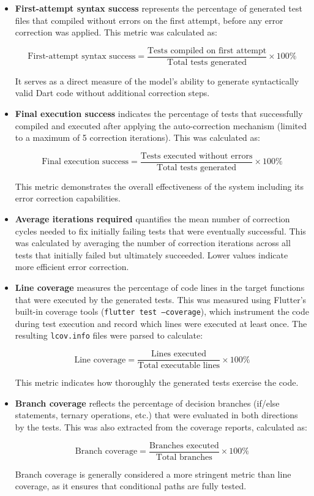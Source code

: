 \begin{itemize}
    \item \textbf{First-attempt syntax success} represents the percentage of generated test files that compiled without errors on the first attempt, before any error correction was applied. This metric was calculated as:
     
     \[
     \text{First-attempt syntax success} = \frac{\text{Tests compiled on first attempt}}{\text{Total tests generated}} \times 100\%
     \]
     
     It serves as a direct measure of the model's ability to generate syntactically valid Dart code without additional correction steps.
    
    \item \textbf{Final execution success} indicates the percentage of tests that successfully compiled and executed after applying the auto-correction mechanism (limited to a maximum of 5 correction iterations). This was calculated as:
    
    \[
    \text{Final execution success} = \frac{\text{Tests executed without errors}}{\text{Total tests generated}} \times 100\%
    \]
    
    This metric demonstrates the overall effectiveness of the system including its error correction capabilities.
    
    \item \textbf{Average iterations required} quantifies the mean number of correction cycles needed to fix initially failing tests that were eventually successful. This was calculated by averaging the number of correction iterations across all tests that initially failed but ultimately succeeded. Lower values indicate more efficient error correction.
    
    \item \textbf{Line coverage} measures the percentage of code lines in the target functions that were executed by the generated tests. This was measured using Flutter's built-in coverage tools (\texttt{flutter test --coverage}), which instrument the code during test execution and record which lines were executed at least once. The resulting \texttt{lcov.info} files were parsed to calculate:
    
    \[ \text{Line coverage} = \frac{\text{Lines executed}}{\text{Total executable lines}} \times 100\% \]
    
    This metric indicates how thoroughly the generated tests exercise the code.
    
    \item \textbf{Branch coverage} reflects the percentage of decision branches (if/else statements, ternary operations, etc.) that were evaluated in both directions by the tests. This was also extracted from the coverage reports, calculated as:
    
    \[ \text{Branch coverage} = \frac{\text{Branches executed}}{\text{Total branches}} \times 100\% \]
    
    Branch coverage is generally considered a more stringent metric than line coverage, as it ensures that conditional paths are fully tested.
\end{itemize}

